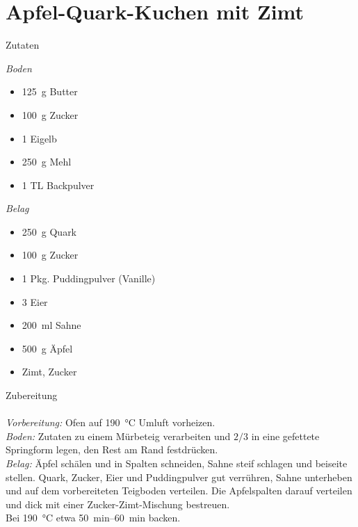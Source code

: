 \section*{Apfel-Quark-Kuchen mit Zimt}
\ihead{}\ohead{}
\cfoot{}
{\Large Zutaten}
\begin{multicols}{2}
\textit{Boden}
\begin{itemize}
    \item \SI{125}{g} Butter
    \item \SI{100}{g} Zucker
    \item \num{1} Eigelb
    \item \SI{250}{g} Mehl
    \item \num{1} TL Backpulver
\end{itemize}
\columnbreak
\textit{Belag}
\begin{itemize}
    \item \SI{250}{g} Quark
    \item \SI{100}{g} Zucker
    \item \num{1} Pkg. Puddingpulver (Vanille)
    \item \num{3} Eier
    \item \SI{200}{ml} Sahne
    \item \SI{500}{g} Äpfel
    \item Zimt, Zucker
\end{itemize}
\end{multicols}
\noindent
{\Large Zubereitung}\\
\\
\textit{Vorbereitung:} Ofen auf \SI{190}{\celsius} Umluft vorheizen.\\
\textit{Boden:} Zutaten zu einem Mürbeteig verarbeiten und $2/3$ in eine gefettete Springform legen, den Rest am Rand festdrücken.\\
\textit{Belag:} Äpfel schälen und in Spalten schneiden, Sahne steif schlagen und beiseite stellen.
Quark, Zucker, Eier und Puddingpulver gut verrühren, Sahne unterheben und auf dem vorbereiteten Teigboden verteilen.
Die Apfelspalten darauf verteilen und dick mit einer Zucker-Zimt-Mischung bestreuen.\\
Bei \SI{190}{\celsius} etwa \SIrange{50}{60}{min} backen.